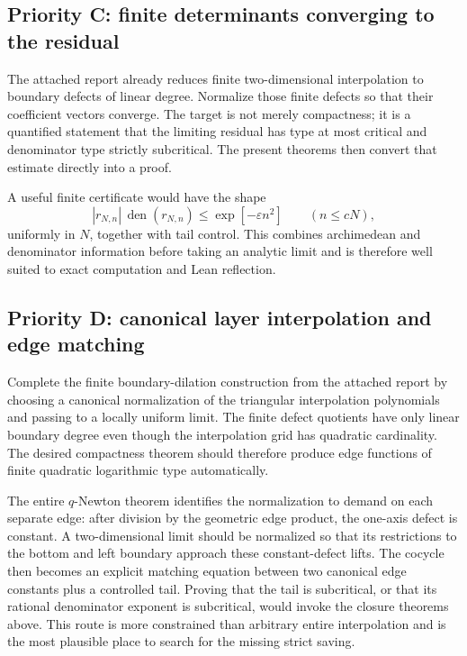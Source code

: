 \documentclass[11pt]{article}
\theoremstyle{definition}
\newcommand{\den}{\operatorname{den}}
\begin{document}
\subsection{Priority C: finite determinants converging to the residual}

The attached report already reduces finite two-dimensional interpolation to boundary defects of linear degree.  Normalize those finite defects so that their coefficient vectors converge.  The target is not merely compactness; it is a quantified statement that the limiting residual has type at most critical and denominator type strictly subcritical.  The present theorems then convert that estimate directly into a proof.

A useful finite certificate would have the shape
\[
  |r_{N,n}|\,\den(r_{N,n})
  \le \exp[-\varepsilon n^2]
  \qquad(n\le cN),
\]
uniformly in \(N\), together with tail control.  This combines archimedean and denominator information before taking an analytic limit and is therefore well suited to exact computation and Lean reflection.

\subsection{Priority D: canonical layer interpolation and edge matching}

Complete the finite boundary-dilation construction from the attached report by choosing a canonical normalization of the triangular interpolation polynomials and passing to a locally uniform limit.  The finite defect quotients have only linear boundary degree even though the interpolation grid has quadratic cardinality.  The desired compactness theorem should therefore produce edge functions of finite quadratic logarithmic type automatically.

The entire \(q\)-Newton theorem identifies the normalization to demand on each separate edge: after division by the geometric edge product, the one-axis defect is constant.  A two-dimensional limit should be normalized so that its restrictions to the bottom and left boundary approach these constant-defect lifts.  The cocycle then becomes an explicit matching equation between two canonical edge constants plus a controlled tail.  Proving that the tail is subcritical, or that its rational denominator exponent is subcritical, would invoke the closure theorems above.  This route is more constrained than arbitrary entire interpolation and is the most plausible place to search for the missing strict saving.
\end{document}
